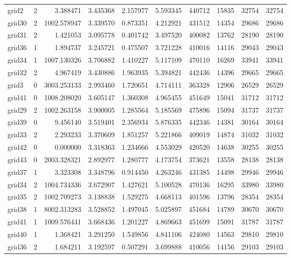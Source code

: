 \documentclass[../../../thesis.tex]{subfiles}
\begin{document}
\begin{longtable}{|l|r|r|r|r|r|r|r|r|r|}
grid2 & 2 & 3.388471 & 3.435368 & 2.157977 & 5.593345 & 440712 & 15835 & 32754 & 32754 \\
grid30 & 2 & 1002.578947 & 3.339570 & 0.873351 & 4.212921 & 431512 & 14354 & 29686 & 29686 \\
grid31 & 2 & 1.421053 & 3.095778 & 0.401742 & 3.497520 & 400082 & 13762 & 28190 & 28190 \\
grid36 & 1 & 1.894737 & 3.245721 & 0.475507 & 3.721228 & 410016 & 14116 & 29043 & 29043 \\
grid34 & 1 & 1007.130326 & 3.706882 & 1.410227 & 5.117109 & 470110 & 16269 & 33941 & 33941 \\
grid32 & 2 & 4.967419 & 3.430886 & 1.963935 & 5.394821 & 442436 & 14396 & 29665 & 29665 \\
grid3 & 0 & 3003.253133 & 2.993460 & 1.720651 & 4.714111 & 363328 & 12906 & 26529 & 26529 \\
grid41 & 0 & 1008.208020 & 3.605147 & 1.360308 & 4.965455 & 451649 & 15041 & 31712 & 31712 \\
grid29 & 2 & 1002.263158 & 3.900005 & 1.285564 & 5.185569 & 475896 & 15094 & 31737 & 31737 \\
grid39 & 0 & 9.456140 & 3.519401 & 2.356934 & 5.876335 & 442346 & 14381 & 30164 & 30164 \\
grid33 & 2 & 2.293233 & 3.370609 & 1.851257 & 5.221866 & 409019 & 14874 & 31032 & 31032 \\
grid42 & 0 & 0.000000 & 3.318363 & 1.234666 & 4.553029 & 420520 & 14638 & 30255 & 30255 \\
grid43 & 0 & 2003.328321 & 2.892977 & 1.280777 & 4.173754 & 373621 & 13558 & 28138 & 28138 \\
grid37 & 1 & 3.323308 & 3.348796 & 0.914450 & 4.263246 & 431385 & 14498 & 29946 & 29946 \\
grid34 & 2 & 1004.734336 & 3.672907 & 1.427621 & 5.100528 & 470136 & 16295 & 33980 & 33980 \\
grid35 & 2 & 1002.709273 & 3.138838 & 1.529275 & 4.668113 & 401596 & 13796 & 28354 & 28354 \\
grid38 & 1 & 8002.313283 & 3.528852 & 1.497045 & 5.025897 & 451684 & 14789 & 30670 & 30670 \\
grid41 & 1 & 1009.576441 & 3.668436 & 1.201227 & 4.869663 & 451699 & 15091 & 31787 & 31787 \\
grid40 & 1 & 1.368421 & 3.291250 & 1.549856 & 4.841106 & 424080 & 14563 & 29810 & 29810 \\
grid36 & 2 & 1.684211 & 3.192597 & 0.507291 & 3.699888 & 410056 & 14156 & 29103 & 29103 \\

\end{longtable}
\end{document}
